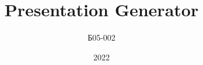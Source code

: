\documentclass{beamer}
\title{Presentation Generator}
\author{Б05-002}
\institute{MIPT}
\date{2022}
\begin{document}
    \frame{\titlepage}
    
\end{document}

